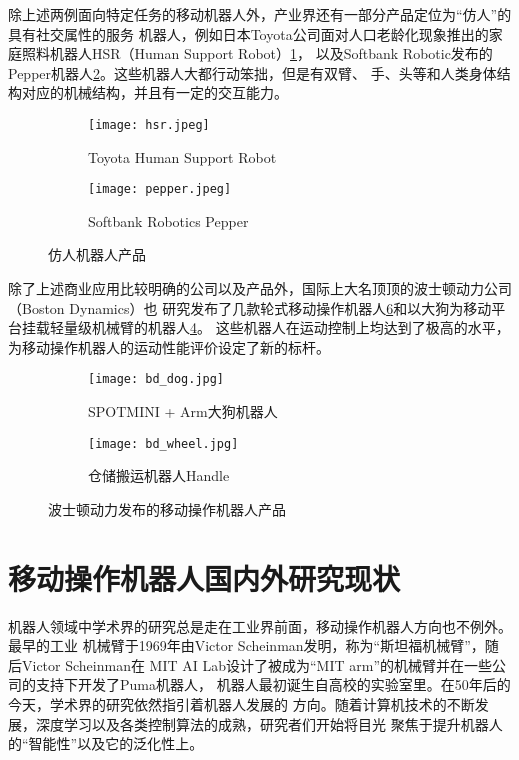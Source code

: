 除上述两例面向特定任务的移动机器人外，产业界还有一部分产品定位为“仿人”的具有社交属性的服务
机器人，例如日本Toyota公司面对人口老龄化现象推出的家庭照料机器人HSR（Human Support Robot）\ref{fig:hsr}，
以及Softbank Robotic发布的Pepper机器人\ref{fig:pepper}。这些机器人大都行动笨拙，但是有双臂、
手、头等和人类身体结构对应的机械结构，并且有一定的交互能力。

\begin{figure}
\centering
\begin{subfigure}{.5\textwidth}
  \centering
  \texttt{[image: hsr.jpeg]}
  \caption{Toyota Human Support Robot}
  \label{fig:hsr}
\end{subfigure}%
\begin{subfigure}{.5\textwidth}
  \centering
  \texttt{[image: pepper.jpeg]}
  \caption{Softbank Robotics Pepper}
  \label{fig:pepper}
\end{subfigure}
\label{fig:hsr_pepper}
\caption{仿人机器人产品}
\end{figure}

除了上述商业应用比较明确的公司以及产品外，国际上大名顶顶的波士顿动力公司（Boston Dynamics）也
研究发布了几款轮式移动操作机器人\ref{fig:bd_wheel}和以大狗为移动平台挂载轻量级机械臂的机器人\ref{fig:bd_dog}。
这些机器人在运动控制上均达到了极高的水平，为移动操作机器人的运动性能评价设定了新的标杆。

\begin{figure}
\centering
\begin{subfigure}{.5\textwidth}
  \centering
  \texttt{[image: bd\_dog.jpg]}
  \caption{SPOTMINI + Arm大狗机器人}
  \label{fig:bd_dog}
\end{subfigure}%
\begin{subfigure}{.5\textwidth}
  \centering
  \texttt{[image: bd\_wheel.jpg]}
  \caption{仓储搬运机器人Handle}
  \label{fig:bd_wheel}
\end{subfigure}
\caption{波士顿动力发布的移动操作机器人产品}
\end{figure}


\section{移动操作机器人国内外研究现状}
\label{cha:research}

机器人领域中学术界的研究总是走在工业界前面，移动操作机器人方向也不例外。最早的工业
机械臂于1969年由Victor Scheinman发明，称为“斯坦福机械臂”，随后Victor Scheinman在
MIT AI Lab设计了被成为“MIT arm”的机械臂并在一些公司的支持下开发了Puma机器人\cite{huangxihuanReview}，
机器人最初诞生自高校的实验室里。在50年后的今天，学术界的研究依然指引着机器人发展的
方向。随着计算机技术的不断发展，深度学习以及各类控制算法的成熟，研究者们开始将目光
聚焦于提升机器人的“智能性”以及它的泛化性上。

